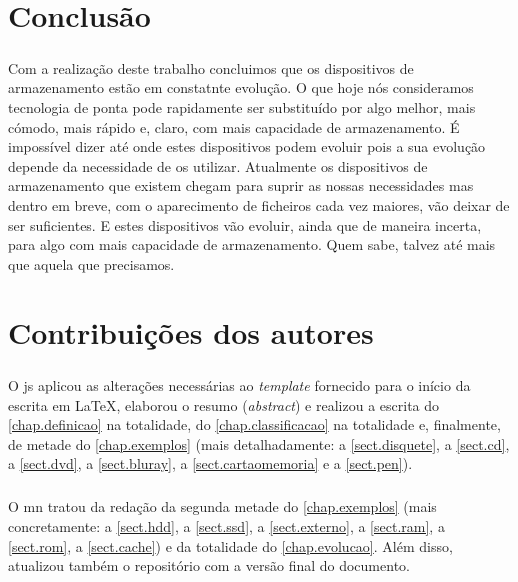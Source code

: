 \documentclass[a4paper]{report}
\begin{document}
\chapter{Conclusão}
\label{chap.conclusao}
\paragraph*{}Com a realização deste trabalho concluimos que os dispositivos de armazenamento estão em constatnte evolução. O que hoje nós consideramos tecnologia de ponta pode rapidamente ser substituído por algo melhor, mais cómodo, mais rápido e, claro, com mais capacidade de armazenamento. É impossível dizer até onde estes dispositivos podem evoluir pois a sua evolução depende da necessidade de os utilizar. Atualmente os dispositivos de armazenamento que existem chegam para suprir as nossas necessidades mas dentro em breve, com o aparecimento de ficheiros cada vez maiores, vão deixar de ser suficientes. E estes dispositivos vão evoluir, ainda que de maneira incerta, para algo com mais capacidade de armazenamento. Quem sabe, talvez até mais que aquela que precisamos.

\chapter*{Contribuições dos autores}
\paragraph*{}O \ac{js} aplicou as alterações necessárias ao \textit{template} fornecido para o início da escrita em \LaTeX , elaborou o resumo (\textit{abstract}) e realizou a escrita do \autoref{chap.definicao} na totalidade, do \autoref{chap.classificacao} na totalidade e, finalmente, de metade do \autoref{chap.exemplos} (mais detalhadamente: a \autoref{sect.disquete}, a \autoref{sect.cd}, a \autoref{sect.dvd}, a \autoref{sect.bluray}, a \autoref{sect.cartaomemoria} e a \autoref{sect.pen}).

\paragraph*{}O \ac{mn} tratou da redação da segunda metade do \autoref{chap.exemplos} (mais concretamente: a \autoref{sect.hdd}, a \autoref{sect.ssd}, a \autoref{sect.externo}, a \autoref{sect.ram}, a \autoref{sect.rom}, a \autoref{sect.cache}) e da totalidade do \autoref{chap.evolucao}. Além disso, atualizou também o repositório com a versão final do documento.
\end{document}
